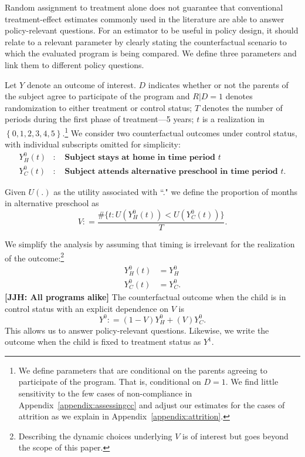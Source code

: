 Random assignment to treatment alone does not guarantee that conventional treatment-effect estimates commonly used in the literature are able to answer policy-relevant questions. For an estimator to be useful in policy design, it should relate to a relevant parameter by clearly stating the counterfactual scenario to which the evaluated program is being compared. We define three parameters and link them to different policy questions.

Let $Y$ denote an outcome of interest. $D$ indicates whether or not the parents of the subject agree to participate of the program and $R | D = 1$ denotes randomization to either treatment or control status; $T$ denotes the number of periods during the first phase of treatment---5 years; $t$ is a realization in $\left\{ 0,1,2,3,4,5 \right\}$.\footnote{We define parameters that are conditional on the parents agreeing to participate of the program. That is, conditional on $D = 1$. We find little sensitivity to the few cases of non-compliance in Appendix~\ref{appendix:assessingcc} and adjust our estimates for the cases of attrition as we explain in Appendix~\ref{appendix:attrition}.} We consider two counterfactual outcomes under control status, with individual subscripts omitted for simplicity:
\begin{eqnarray}
Y_H^0\left(t \right) &:& \textbf{ Subject stays at home in time period $t$} \nonumber \\
Y_C^0\left(t \right) &:& \textbf{ Subject attends alternative preschool in time period $t$}.  \nonumber
\end{eqnarray}

Given $U(.)$ as the utility associated with ``." we define the proportion of months in alternative preschool as
\begin{equation}
V : = \frac{\# \{ t: U(Y_H^0 \left( t \right)) < U(Y_C^0 \left( t \right)) \} }{T}.
\end{equation}

We simplify the analysis by assuming that timing is irrelevant for the realization of the outcome:\footnote{Describing the dynamic choices underlying $V$ is of interest but goes beyond the scope of this paper.}
\begin{align}
Y_H^0 \left( t \right) &= Y_H^0 \nonumber \\
Y_C^0 \left( t \right) &= Y_C^0.
\end{align}
\textbf{[JJH: All programs alike]} The counterfactual outcome when the child is in control status with an explicit dependence on $V$ is
\begin{equation}
Y^0 : = \left( 1 - V \right) Y_H^0 + \left( V \right) Y_C^0.
\end{equation}
This allows us to answer policy-relevant questions. Likewise, we write the outcome when the child is fixed to treatment status as $Y^1$.

